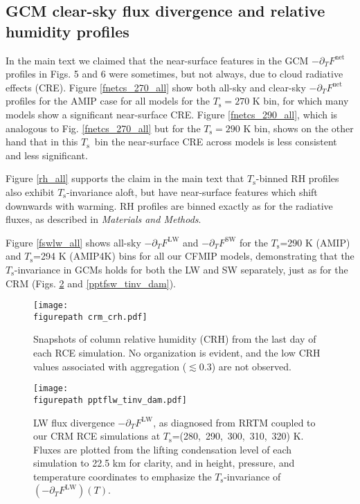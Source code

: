 \documentclass[9pt,twoside,lineno]{pnas-new}
\newcommand{\ppt}{\ensuremath{\partial_T}}
\newcommand{\FLW}{\ensuremath{F^\mathrm{LW}}}
\newcommand{\FSW}{\ensuremath{F^\mathrm{SW}}}
\newcommand{\Fnet}{\ensuremath{F^\mathrm{net}}}
\newcommand{\Ts}{\ensuremath{T_\mathrm{s}}}
\newcommand{\figurepath}{../../../figures_paper/}
\begin{document}
\subsection{GCM clear-sky flux divergence and relative humidity profiles}
In the main text we claimed that the near-surface features in the GCM $-\ppt\Fnet$ profiles in Figs. 5 and 6 were sometimes, but not always, due to cloud radiative effects (CRE). Figure \ref{fnetcs_270_all} show both all-sky and clear-sky $-\ppt\Fnet$ profiles for the AMIP case for all models for the $\Ts=270$ K bin, for which many models show a significant near-surface CRE. Figure \ref{fnetcs_290_all}, which is analogous to Fig. \ref{fnetcs_270_all} but for the $\Ts=290$ K bin, shows on the other hand that in this \Ts\ bin  the near-surface CRE across models is less consistent and less significant. 

 Figure \ref{rh_all} supports the claim in the main text that \Ts-binned RH profiles also exhibit \Ts-invariance aloft, but have near-surface features which shift downwards with warming. RH profiles are binned exactly as for the radiative fluxes, as described in \emph{Materials and Methods}.
 
Figure \ref{fswlw_all} shows  all-sky $-\ppt \FLW$ and $-\ppt \FSW$ for the \Ts=290 K (AMIP) and \Ts=294 K (AMIP4K) bins for all our CFMIP models, demonstrating that the \Ts-invariance in GCMs holds for both the LW and SW separately, just as for the CRM (Figs. \ref{pptflw_tinv_dam} and \ref{pptfsw_tinv_dam}).




 
\begin{figure}[h]
        \begin{center}
                        \texttt{[image: \\figurepath crm\_crh.pdf]}
		\caption{Snapshots  of column relative humidity (CRH) from the last day of each RCE simulation. No organization is evident, and the low CRH values associated with aggregation ($\lesssim 0.3$) are not observed. 
		\label{crm_crh}                
		}
        \end{center}
\end{figure}

\begin{figure}[h]
        \begin{center}
                        \texttt{[image: \\figurepath pptflw\_tinv\_dam.pdf]}
		\caption{LW flux divergence  $-\ppt \FLW$, as diagnosed from RRTM coupled to our CRM RCE simulations at \Ts=(280,\ 290,\ 300,\ 310,\ 320) K. Fluxes are plotted from the lifting condensation level of each simulation to 22.5 km for clarity, and  in height, pressure, and temperature coordinates to emphasize the \Ts-invariance of  $(-\ppt \FLW)(T)$. 
		\label{pptflw_tinv_dam}                
		}
        \end{center}
\end{figure}
\end{document}
